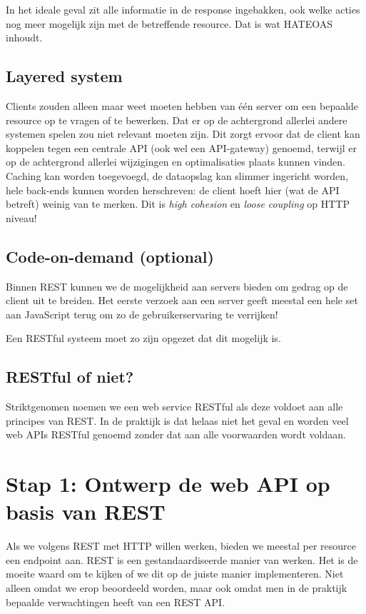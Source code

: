 In het ideale geval zit alle informatie in de response ingebakken,
ook welke acties nog meer mogelijk zijn met de betreffende resource.
Dat is wat HATEOAS inhoudt.

\subsection{Layered system}
Clients zouden alleen maar weet moeten hebben van één server 
om een bepaalde resource op te vragen of te bewerken. Dat er 
op de achtergrond allerlei andere systemen spelen zou niet relevant 
moeten zijn. Dit zorgt ervoor dat de client kan koppelen tegen 
een centrale API (ook wel een API-gateway) genoemd, terwijl er op 
de achtergrond allerlei wijzigingen en optimalisaties plaats kunnen
vinden. Caching kan worden toegevoegd, de dataopslag kan slimmer 
ingericht worden, hele back-ends kunnen worden herschreven: de client 
hoeft hier (wat de API betreft) weinig van te merken.
Dit is \textit{high cohesion} 
en \textit{loose coupling} op HTTP niveau!

\subsection{Code-on-demand (optional)}
Binnen REST kunnen we de mogelijkheid aan servers bieden om gedrag 
op de client uit te breiden. Het eerste verzoek aan een server geeft 
meestal een hele set aan JavaScript terug om zo de gebruikerservaring 
te verrijken!

Een RESTful systeem moet zo zijn opgezet dat dit mogelijk is.

\subsection{RESTful of niet?}
Striktgenomen noemen we een web service RESTful als deze voldoet aan 
alle principes van REST. In de praktijk is dat helaas niet het geval
en worden veel web APIs RESTful genoemd zonder dat aan alle voorwaarden 
wordt voldaan.

\section{Stap 1: Ontwerp de web API op basis van REST}
Als we volgens REST met HTTP willen werken, bieden we meestal per resource een endpoint aan. 
REST is een gestandaardiseerde manier van werken. 
Het is de moeite waard om te kijken of we dit op de juiste manier implementeren. 
Niet alleen omdat we erop beoordeeld worden, maar ook omdat men in de praktijk bepaalde verwachtingen heeft van een REST API.

